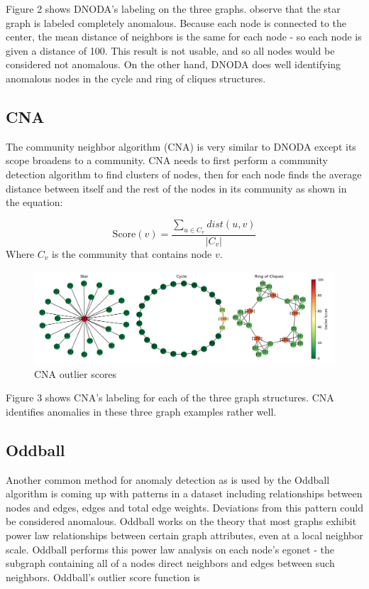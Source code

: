 \documentclass[10pt,letterpaper]{article}
\begin{document}
Figure 2 shows DNODA's labeling on the three graphs. observe that the star graph is
labeled completely anomalous. Because each node is connected to the center, the mean
distance of neighbors is the same for each node - so each node is given a distance of
100. This result is not usable, and so all nodes would be considered not anomalous.
On the other hand, DNODA does well identifying anomalous nodes in the cycle and ring
of cliques structures.

\subsection{CNA}

The community neighbor algorithm (CNA) is very similar to DNODA except its scope
broadens to a community. CNA needs
to first perform a community detection algorithm to find clusters of nodes, then
for each node finds the average distance between itself and the rest of the nodes
in its community as shown in the equation:

$$ \text{Score}(v) = \frac{\sum_{u \in C_v} dist(u, v) }{|C_v|} $$
Where $C_v$ is the community that contains node $v$.

\begin{figure}[ht]
\includegraphics[width=\textwidth]{"../graphics/CNAExample.png"}
\caption{CNA outlier scores}
\end{figure}

Figure 3 shows CNA's labeling for each of the three graph structures. CNA identifies
anomalies in these three graph examples rather well.

\subsection{Oddball}

Another common method for anomaly detection as is used by the Oddball algorithm
is coming up with patterns in a dataset including relationships between nodes
and edges, edges and total edge weights. Deviations from this pattern could be
considered anomalous\cite{OddBall}. Oddball works on the theory that most
graphs exhibit power law relationships between certain graph attributes, even at
a local neighbor scale. Oddball performs this power law analysis on each node's
egonet - the subgraph containing all of a nodes direct neighbors and edges between
such neighbors. Oddball's outlier score function is
\end{document}
